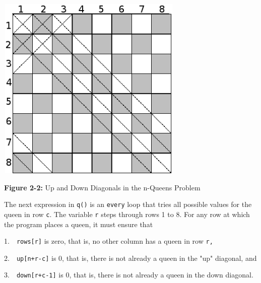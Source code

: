 \bigskip

\begin{center}
\includegraphics[width=3.5in,height=3.5in]{ub-img/diagonal.png}
\end{center}
{\sffamily\bfseries Figure 2-2:}
{\sffamily Up and Down Diagonals in the n-Queens Problem}

\bigskip


The next expression in \texttt{q()} is an \texttt{every} loop that tries
all possible values for the queen in row \texttt{c}. The variable
\texttt{r} steps through rows 1 to 8. For any row at which the program
places a queen, it must ensure that

1.\ \ \texttt{rows[r]} is zero, that is, no other column has a queen in
row \texttt{r}\texttt{,}

2.\ \ \texttt{up[n+r-c]} is 0, that is, there is not already a queen in
the "up" diagonal, and

3.\ \ \texttt{down[r+c-1]} is 0, that is, there is not already a queen
in the down diagonal.

